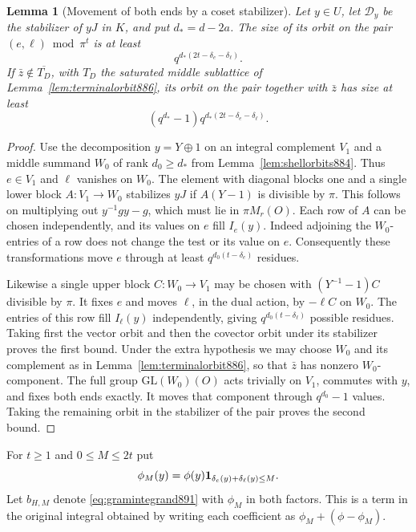 \documentclass[a4paper,11pt]{article}
\newtheorem{lemma}[proposition]{Lemma}
\theoremstyle{definition}
\theoremstyle{remark}
\numberwithin{equation}{section}
\begin{document}
\begin{lemma}[Movement of both ends by a coset stabilizer]
\leavevmode\label{lem:endorbit894}
Let \(y\in U\), let \(\mathcal D_y\) be the stabilizer of \(yJ\)
in \(K\), and put \(d_*=d-2a\). The size of its orbit on the
pair \((e,\ell)\bmod\pi^t\) is at least
\[
                  q^{d_*(2t-\delta_e-\delta_\ell)} .
\]
If \(\bar z\notin\overline{T_D}\), with \(T_D\) the saturated
middle sublattice of Lemma~\ref{lem:terminalorbit886}, its orbit
on the pair together with \(\bar z\) has size at least
\[
           (q^{d_*}-1)q^{d_*(2t-\delta_e-\delta_\ell)} .
\]
\end{lemma}
\begin{proof}
Use the decomposition \(y=Y\oplus1\) on an integral complement
\(V_1\) and a middle summand \(W_0\) of rank \(d_0\ge d_*\) from
Lemma~\ref{lem:shellorbits884}. Thus \(e\in V_1\) and \(\ell\)
vanishes on \(W_0\). The element with diagonal blocks one and
a single lower block \(A:V_1\to W_0\) stabilizes \(yJ\) if
\(A(Y-1)\) is divisible by \(\pi\). This follows on multiplying
out \(y^{-1}g y-g\), which must lie in \(\pi M_r(O)\).
Each row of \(A\) can be chosen independently, and its values
on \(e\) fill \(I_e(y)\). Indeed adjoining the \(W_0\)-entries
of a row does not change the test or its value on \(e\).
Consequently these transformations move \(e\) through at least
\(q^{d_0(t-\delta_e)}\) residues.

Likewise a single upper block \(C:W_0\to V_1\) may be chosen with
\((Y^{-1}-1)C\) divisible by \(\pi\). It fixes \(e\) and moves
\(\ell\), in the dual action, by \(-\ell C\) on \(W_0\).
The entries of this row fill \(I_\ell(y)\) independently, giving
\(q^{d_0(t-\delta_\ell)}\) possible residues. Taking first the
vector orbit and then the covector orbit under its stabilizer
proves the first bound. Under the extra hypothesis we may choose
\(W_0\) and its complement as in Lemma~\ref{lem:terminalorbit886},
so that \(\bar z\) has nonzero \(W_0\)-component. The full group
\(\mathrm{GL}(W_0)(O)\) acts trivially on \(V_1\), commutes with
\(y\), and fixes both ends exactly. It moves that component
through \(q^{d_0}-1\) values. Taking the remaining orbit in the
stabilizer of the pair proves the second bound.
\end{proof}

For \(t\ge1\) and \(0\le M\le2t\) put
\[
 \phi_M(y)=\phi(y){\bf1}_{\delta_e(y)+\delta_\ell(y)\le M}.
\]
Let \(b_{H,M}\) denote \eqref{eq:gramintegrand891} with
\(\phi_M\) in both factors. This is a term in the original
integral obtained by writing each coefficient as
\(\phi_M+(\phi-\phi_M)\).
\end{document}
